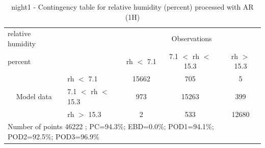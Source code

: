 \begin{table}[p!]
\begin{center}
\begin{tabular}{llccc}
\hline
{relative humidity}                                       &                                                    & \multicolumn{3}{c}{Observations}                 \\
{percent}                                       &                             & rh $<$ 7.1   & 7.1 $<$ rh $<$ 15.3 & rh $>$ 15.3 \\
\hline
\multicolumn{1}{c}{\multirow{3}{*}{Model data}}  & rh $<$ 7.1             & 15662                & 705                       & 5              \\
                                                 & 7.1  $<$ rh $<$ 15.3 & 973                & 15263                       & 399              \\
                                                 & rh $>$ 15.3             & 2                & 533                       & 12680              \\
\hline
\multicolumn{5}{l}{ Number of points        46222 ; PC=94.3\%; EBD=0.0\%; POD1=94.1\%; POD2=92.5\%; POD3=96.9\%}
\end{tabular}
\end{center}
\caption{night1 - Contingency table for  relative humidity (percent) processed with AR (1H)}
\label{tab:contingencyrhAFT:night1}
\end{table}
